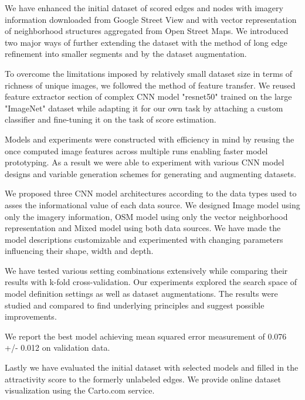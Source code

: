 We have enhanced the initial dataset of scored edges and nodes with imagery information downloaded from Google Street View and with vector representation of neighborhood structures aggregated from Open Street Maps. We introduced two major ways of further extending the dataset with the method of long edge refinement into smaller segments and by the dataset augmentation.

To overcome the limitations imposed by relatively small dataset size in terms of richness of unique images, we followed the method of feature transfer. We reused feature extractor section of complex CNN model "resnet50" trained on the large "ImageNet" dataset while adapting it for our own task by attaching a custom classifier and fine-tuning it on the task of score estimation.

Models and experiments were constructed with efficiency in mind by reusing the once computed image features across multiple runs enabling faster model prototyping.
As a result we were able to experiment with various CNN model designs and variable generation schemes for generating and augmenting datasets.

We proposed three CNN model architectures according to the data types used to asses the informational value of each data source.  We designed Image model using only the imagery information, OSM model using only the vector neighborhood representation and Mixed model using both data sources. 
We have made the model descriptions customizable and experimented with changing parameters influencing their shape, width and depth.
 
We have tested various setting combinations extensively while comparing their results with k-fold cross-validation. Our experiments explored the search space of model definition settings as well as dataset augmentations. The results were studied and compared to find underlying principles and suggest possible improvements.

We report the best model achieving mean squared error measurement of 0.076 +/- 0.012 on validation data.

Lastly we have evaluated the initial dataset with selected models and filled in the attractivity score to the formerly unlabeled edges. We provide online dataset visualization using the Carto.com service.

\endinput
